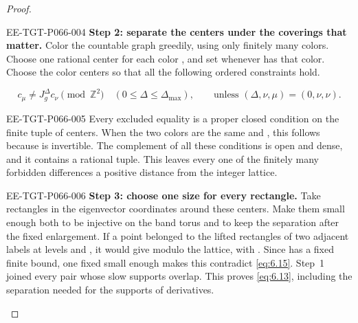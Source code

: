 \begin{proof}
\begin{EESegment}{EE-TGT-P066-004}
\textbf{Step 2: separate the centers under the coverings that matter.} Color the countable graph greedily, using only finitely many colors. Choose one rational center  for each color , and set  whenever  has that color. Choose the color centers so that all the following ordered constraints hold.
\end{EESegment}
\begin{equation}
 c_\mu\ne J_g^\Delta c_\nu\pmod{\mathbb Z^2}
 \quad (0\le\Delta\le\Delta_{\max}),
 \qquad
 \text{unless }(\Delta,\nu,\mu)=(0,\nu,\nu).
 \tag{6.15}\label{eq:6.15}
\end{equation}
\begin{EESegment}{EE-TGT-P066-005}
Every excluded equality is a proper closed condition on the finite tuple of centers. When the two colors are the same and , this follows because  is invertible. The complement of all these conditions is open and dense, and it contains a rational tuple. This leaves every one of the finitely many forbidden differences a positive distance from the integer lattice.
\end{EESegment}

\begin{EESegment}{EE-TGT-P066-006}
\textbf{Step 3: choose one size for every rectangle.} Take rectangles in the eigenvector coordinates around these centers. Make them small enough both to be injective on the band torus and to keep the separation after the fixed enlargement. If a point belonged to the lifted rectangles of two adjacent labels at levels  and , it would give  modulo the lattice, with . Since  has a fixed finite bound, one fixed  small enough makes this contradict \eqref{eq:6.15}. Step~1 joined every pair whose slow supports overlap. This proves \eqref{eq:6.13}, including the separation needed for the supports of derivatives.
\end{EESegment}
\end{proof}

